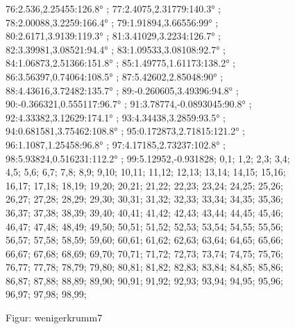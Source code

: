 \documentclass[a4paper,10pt,ngerman]{scrartcl}
\begin{document}
\begin{figure}[!h]
{    76:2.536,2.25455:126.8° ;
    77:2.4075,2.31779:140.3° ;
    78:2.00088,3.2259:166.4° ;
    79:1.91894,3.66556:99° ;
    80:2.6171,3.9139:119.3° ;
    81:3.41029,3.2234:126.7° ;
    82:3.39981,3.08521:94.4° ;
    83:1.09533,3.08108:92.7° ;
    84:1.06873,2.51366:151.8° ;
    85:1.49775,1.61173:138.2° ;
    86:3.56397,0.74064:108.5° ;
    87:5.42602,2.85048:90° ;
    88:4.43616,3.72482:135.7° ;
    89:-0.260605,3.49396:94.8° ;
    90:-0.366321,0.555117:96.7° ;
    91:3.78774,-0.0893045:90.8° ;
    92:4.33382,3.12629:174.1° ;
    93:4.34438,3.2859:93.5° ;
    94:0.681581,3.75462:108.8° ;
    95:0.172873,2.71815:121.2° ;
    96:1.1087,1.25458:96.8° ;
    97:4.17185,2.73237:102.8° ;
    98:5.93824,0.516231:112.2° ;
    99:5.12952,-0.931828;
}{
0,1;
1,2;
2,3;
3,4;
4,5;
5,6;
6,7;
7,8;
8,9;
9,10;
10,11;
11,12;
12,13;
13,14;
14,15;
15,16;
16,17;
17,18;
18,19;
19,20;
20,21;
21,22;
22,23;
23,24;
24,25;
25,26;
26,27;
27,28;
28,29;
29,30;
30,31;
31,32;
32,33;
33,34;
34,35;
35,36;
36,37;
37,38;
38,39;
39,40;
40,41;
41,42;
42,43;
43,44;
44,45;
45,46;
46,47;
47,48;
48,49;
49,50;
50,51;
51,52;
52,53;
53,54;
54,55;
55,56;
56,57;
57,58;
58,59;
59,60;
60,61;
61,62;
62,63;
63,64;
64,65;
65,66;
66,67;
67,68;
68,69;
69,70;
70,71;
71,72;
72,73;
73,74;
74,75;
75,76;
76,77;
77,78;
78,79;
79,80;
80,81;
81,82;
82,83;
83,84;
84,85;
85,86;
86,87;
87,88;
88,89;
89,90;
90,91;
91,92;
92,93;
93,94;
94,95;
95,96;
96,97;
97,98;
98,99;
}
\caption{Figur: wenigerkrumm7}
\label{fig:wenigerkrumm7}
\end{figure}
\newpage
\end{document}
